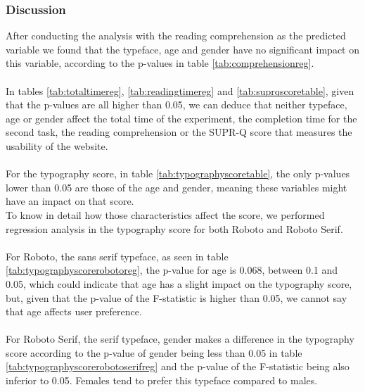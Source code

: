 \documentclass{article}
\begin{document}
\subsubsection{Discussion}
After conducting the analysis with the reading comprehension as the predicted variable we found that the typeface, age and gender have no significant impact on this variable, according to the p-values in table \ref{tab:comprehensionreg}.
\\\\
In tables \ref{tab:totaltimereg}, \ref{tab:readingtimereg} and \ref{tab:suprqscoretable}, given that the p-values are all higher than 0.05, we can deduce that neither typeface, age or gender affect the total time of the experiment, the completion time for the second task, the reading comprehension or the SUPR-Q score that measures the usability of the website.
\\\\
For the typography score, in table \ref{tab:typographyscoretable}, the only p-values lower than 0.05 are those of the age and gender, meaning these variables might have an impact on that score.\\
To know in detail how those characteristics affect the score, we performed regression analysis in the typography score for both Roboto and Roboto Serif.
\\\\
For Roboto, the sans serif typeface, as seen in table \ref{tab:typographyscorerobotoreg}, the p-value for age is 0.068, between 0.1 and 0.05, which could indicate that age has a slight impact on the typography score, but, given that the p-value of the F-statistic is higher than 0.05, we cannot say that age affects user preference.
\\\\
For Roboto Serif, the serif typeface, gender makes a difference in the typography score according to the p-value of gender being less than 0.05 in table \ref{tab:typographyscorerobotoserifreg} and the p-value of the F-statistic being also inferior to 0.05. Females tend to prefer this typeface compared to males.

\newpage
\end{document}
